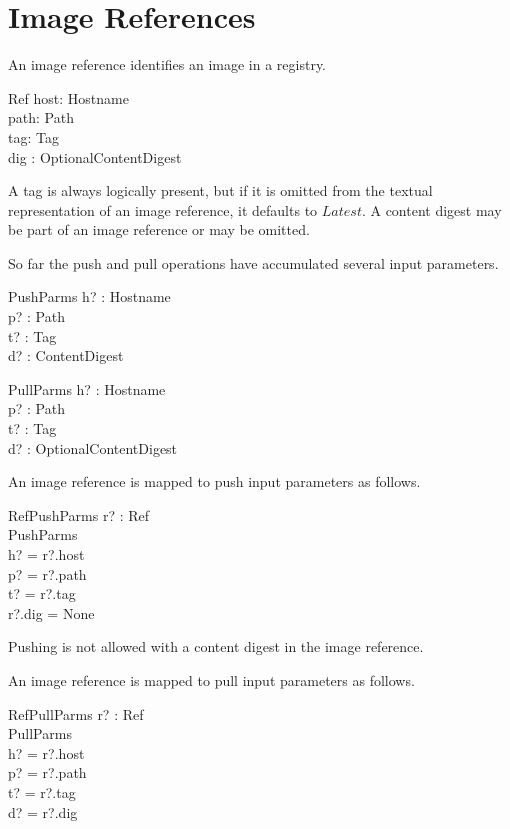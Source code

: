 \documentclass[a4paper,twoside,12pt]{article}
\begin{document}
\newpage
\section{Image References}

An image reference identifies an image in a registry.
\begin{schema}{Ref}
    host: Hostname \\
    path: Path \\
    tag: Tag \\
    dig : OptionalContentDigest \\
\end{schema}
A tag is always logically present, but if it is omitted from the textual representation of an image reference, it defaults to $Latest$.
A content digest may be part of an image reference or may be omitted.

So far the push and pull operations have accumulated several input parameters.
\begin{schema}{PushParms}
    h? : Hostname \\
    p? : Path \\
    t? : Tag \\
    d? : ContentDigest \\
\end{schema}
\begin{schema}{PullParms}
    h? : Hostname \\
    p? : Path \\
    t? : Tag \\
    d? : OptionalContentDigest \\
\end{schema}

An image reference is mapped to push input parameters as follows.
\begin{schema}{RefPushParms}
    r? : Ref \\
    PushParms \\
\where
    h? = r?.host \\
    p? = r?.path \\
    t? = r?.tag \\
    r?.dig = None \\
\end{schema}
Pushing is not allowed with a content digest in the image reference.

An image reference is mapped to pull input parameters as follows.
\begin{schema}{RefPullParms}
    r? : Ref \\
    PullParms \\
\where
    h? = r?.host \\
    p? = r?.path \\
    t? = r?.tag \\
    d? = r?.dig \\
\end{schema}
\end{document}
